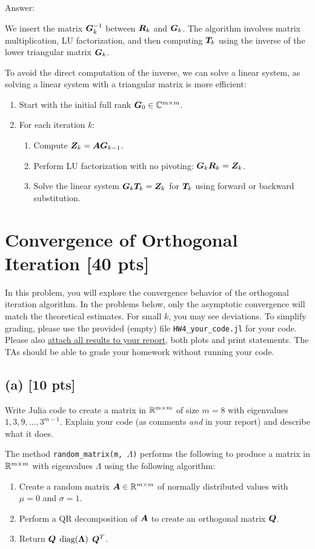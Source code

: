 \documentclass[twoside,10pt]{article}
\begin{document}
Answer:

We insert the matrix $\bm{G}_{k}^{-1}$ between $\bm{R}_k$ and $\bm{G}_k$. The algorithm involves matrix multiplication, LU factorization, and then computing $\bm{T}_k$ using the inverse of the lower triangular matrix $\bm{G}_k$.

To avoid the direct computation of the inverse, we can solve a linear system, as solving a linear system with a triangular matrix is more efficient:

\begin{enumerate}
  \item Start with the initial full rank $\bm{G}_0 \in \mathbb{C}^{m \times m}$.
  \item For each iteration $k$:
   \begin{enumerate}
   \item Compute $\bm{Z}_k = \bm{A} \bm{G}_{k - 1}$.
   \item Perform LU factorization with no pivoting: $\bm{G}_{k} \bm{R}_{k} = \bm{Z}_k$.
   \item Solve the linear system $\bm{G}_k \bm{T}_k = \bm{Z}_k$ for $\bm{T}_k$ using forward or backward substitution.
   \end{enumerate}
\end{enumerate}

\section{Convergence of Orthogonal Iteration [40 pts]}
  In this problem, you will explore the convergence behavior of the orthogonal iteration algorithm. In the problems below, only the asymptotic convergence will match the theoretical estimates. 
  For small $k$, you may see deviations. 
  To simplify grading, please use the provided (empty) file \texttt{HW4\_your\_code.jl} for your code. 
  Please also \underline{attach all results to your report}, both plots and print statements. 
  The TAs should be able to grade your homework without running your code. 
  \subsection*{(a) [10 pts]} 
    Write Julia code to create a matrix in $\mathbb{R}^{m \times m}$ of size $m = 8$ with eigenvalues $1, 3, 9, \ldots, 3^{m -1}$. 
    Explain your code (as comments \emph{and} in your report) and describe what it does.

    The method \verb|random_matrix(m, |$\Lambda$\verb|)| performs the following to produce a matrix in $\mathbb{R}^{m \times m}$ with eigenvalues $\Lambda$ using the following algorithm:
    \begin{enumerate}
      \item Create a random matrix $\bm{A} \in \mathbb{R}^{m \times m}$ of normally distributed values with $\mu = 0$ and $\sigma = 1$.
      \item Perform a QR decomposition of $\bm{A}$ to create an orthogonal matrix $\bm{Q}$.
      \item Return $\bm{Q}$ $\text{diag}(\bm{\Lambda})$ $\bm{Q}^T$.
    \end{enumerate}
\end{document}
